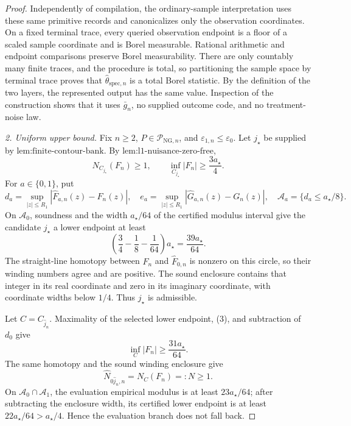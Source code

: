 \documentclass{article}
\begin{document}
\begin{proof}
Independently of compilation, the ordinary-sample interpretation uses these
same primitive records and canonicalizes only the observation coordinates.
On a fixed terminal trace, every queried observation endpoint is a floor of
a scaled sample coordinate and is Borel measurable.  Rational arithmetic
and endpoint comparisons preserve Borel measurability.  There are only
countably many finite traces, and the procedure is total, so partitioning the
sample space by terminal trace proves that
\(\widehat\theta_{\mathrm{spec},n}\) is a total Borel statistic.  By the
definition of the two layers, the represented output has the same value.
Inspection of the construction shows that it uses \(\bar g_n\), no supplied
outcome code, and no treatment-noise law.

\emph{2. Uniform upper bound.}
Fix \(n\ge2\), \(P\in\mathcal P_{\mathrm{NG},n}\), and
\(\varepsilon_{1,n}\le\varepsilon_0\).  Let \(j_{\star}\) be supplied by
\(\text{lem:finite-contour-bank}\).  By
\(\text{lem:l1-nuisance-zero-free}\),
\[
 N_{C_{j_{\star}}}(F_n)\ge1,
 \qquad
 \inf_{C_{j_{\star}}}|F_n|\ge\frac{3a_{\star}}4.                 \tag{2}
\]
For \(a\in\{0,1\}\), put
\[
 d_a=\sup_{|z|\le R_1}|\widehat F_{a,n}(z)-F_n(z)|,
 \quad
 e_a=\sup_{|z|\le R_1}|\widehat G_{a,n}(z)-G_n(z)|,
 \quad
 \mathcal A_a=\{d_a\le a_{\star}/8\}.
\]
On \(\mathcal A_0\), soundness and the width
\(a_{\star}/64\) of the certified modulus interval give the candidate
\(j_{\star}\) a lower endpoint at least
\[
 \left(\frac34-\frac18-\frac1{64}\right)a_{\star}
 =\frac{39a_{\star}}{64}.                                        \tag{3}
\]
The straight-line homotopy between \(F_n\) and
\(\widehat F_{0,n}\) is nonzero on this circle, so their winding numbers
agree and are positive.  The sound enclosure contains that integer in its
real coordinate and zero in its imaginary coordinate, with coordinate
widths below \(1/4\).  Thus \(j_{\star}\) is admissible.

Let \(C=C_{\widehat j_n}\).  Maximality of the selected lower endpoint,
(3), and subtraction of \(d_0\) give
\[
 \inf_C|F_n|\ge\frac{31a_{\star}}{64}.                            \tag{4}
\]
The same homotopy and the sound winding enclosure give
\[
 \widehat N_{0\widehat j_n,n}=N_C(F_n)=:N\ge1.                   \tag{5}
\]
On \(\mathcal A_0\cap\mathcal A_1\), the evaluation empirical modulus is
at least \(23a_{\star}/64\); after subtracting the enclosure width, its
certified lower endpoint is at least \(22a_{\star}/64>a_{\star}/4\).
Hence the evaluation branch does not fall back.


\end{proof}
\end{document}

